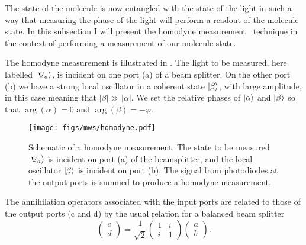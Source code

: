 The state of the molecule is now entangled with the state of the light in such
a way that measuring the phase of the light will perform a readout of the
molecule state. In this subsection I will present the homodyne
measurement~\cite{agarwal2012} technique in the context of performing a
measurement of our molecule state.

The homodyne measurement is illustrated in . The
light to be measured, here labelled $\ket{\Psi_a}$, is incident on one port (a)
of a beam splitter. On the other port (b) we have a strong local oscillator in
a coherent state $\ket{\beta}$, with large amplitude, in this case meaning that
$|\beta| \gg |\alpha|$. We set the relative phases of $\ket{\alpha}$ and
$\ket{\beta}$ so that $\arg(\alpha)=0$ and $\arg(\beta)=-\varphi$.

\begin{figure}
  \centering
  \texttt{[image: figs/mws/homodyne.pdf]}
  \caption[Schematic of a homodyne measurement]{
    Schematic of a homodyne measurement. The state to be measured
    $\ket{\Psi_a}$ is incident on port (a) of the beamsplitter, and the local
    oscillator $\ket{\beta}$ is incident on port (b). The signal from
    photodiodes at the output ports is summed to produce a homodyne
    measurement.
  }
  \label{mws:fig:homodyne}
\end{figure}

The annihilation operators associated with the input ports are related to those
of the output ports (c and d) by the usual relation for a balanced beam
splitter~\cite{agarwal2012}
%
\begin{equation}
  \label{squeeze:eqn:bsmat}
  \begin{pmatrix} c \\ d \end{pmatrix} = \frac{1}{\sqrt{2}}\begin{pmatrix}
    1 & i \\ i & 1 
  \end{pmatrix}  \begin{pmatrix} a \\ b \end{pmatrix}.
\end{equation}

